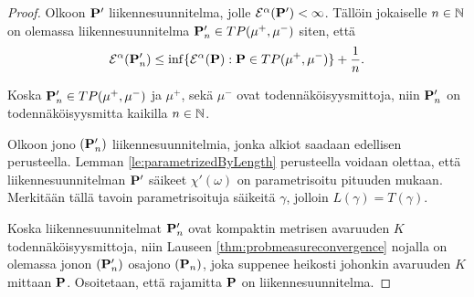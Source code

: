 \documentclass[12pt,oneside,a4paper]{amsbook} %
\begin{document}
\begin{proof}
    
    Olkoon $\P'$ liikennesuunnitelma, jolle $\E^\alpha(\P') < \infty$.
    Tällöin jokaiselle $n\in\N$ on olemassa liikennesuunnitelma $\P_n'\in TP(\mu^+, \mu^-)$ siten, että 
        \begin{equation}\label{eq:mainthm1}
            \E^\alpha(\P_n') \le \inf \{\E^\alpha(\P): \P\in TP(\mu^+, \mu^-)\} + \frac{1}{n}.
        \end{equation}
    
    Koska $\P_n' \in TP(\mu^+, \mu^-)$ ja $\mu^+$, sekä $\mu^-$ ovat todennäköisyysmittoja, niin $\P_n'$ on todennäköisyysmitta kaikilla $n \in \N$.
    
    Olkoon jono $(\P_n')$ liikennesuunnitelmia, jonka alkiot saadaan edellisen perusteella. Lemman \ref{le:parametrizedByLength} perusteella voidaan olettaa, että liikennesuunnitelman $\P'$ säikeet $\chi'(\omega)$ on parametrisoitu pituuden mukaan. Merkitään tällä tavoin parametrisoituja säikeitä $\gamma$, jolloin $L(\gamma) = T(\gamma)$. 
    
    Koska liikennesuunnitelmat $\P_n'$ ovat kompaktin metrisen avaruuden $K$ todennäköisyysmittoja, niin Lauseen \ref{thm:probmeasureconvergence} nojalla on olemassa jonon $(\P_n')$ osajono $(\P_n)$, joka suppenee heikosti johonkin avaruuden $K$ mittaan $\P$. Osoitetaan, että rajamitta $\P$ on liikennesuunnitelma.
    

\end{proof}
\end{document}
